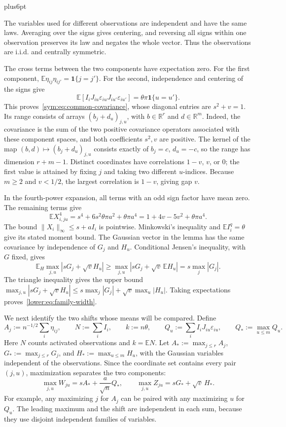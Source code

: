 \documentclass[11pt,letterpaper,twoside,leqno]{article}
\makeatletter
\theoremstyle{bookplain}
\theoremstyle{bookremark}
\renewenvironment{proof}[1][\proofname]{\par
  \pushQED{\qed}\normalfont\topsep6pt plus6pt\relax
  \trivlist\item[\hskip\labelsep\bfseries #1\@addpunct{.}]\ignorespaces
}{\popQED\endtrivlist\@endpefalse}
\newcommand{\E}{\mathbb E}
\newcommand{\R}{\mathbb R}
\newcommand{\ind}{\mathbf 1}
\makeatother
\begin{document}
\begin{proof}
The variables used for different observations are independent and
have the same laws. Averaging over the signs gives centering, and
reversing all signs within one observation preserves its law and
negates the whole vector. Thus the observations are i.i.d. and
centrally symmetric.

The cross terms between the two components have expectation zero.
For the first component,
$\E\eta_{ij}\eta_{ij'}=\ind\{j=j'\}$. For the second,
independence and centering of the signs give
\[
 \E[I_iJ_{iu}\varepsilon_{iu}J_{iu'}\varepsilon_{iu'}]
 =\theta\pi\ind\{u=u'\}.
\]
This proves~\eqref{sym:eq:common-covariance}, whose diagonal
entries are $s^2+v=1$. Its range consists of arrays
$(b_j+d_u)_{j,u}$, with $b\in\R^r$ and $d\in\R^m$.
Indeed, the covariance is the sum of the two positive covariance
operators associated with these component spaces, and both
coefficients $s^2,v$ are positive. The kernel of the map
$(b,d)\mapsto(b_j+d_u)_{j,u}$ consists exactly of
$b_j=c$, $d_u=-c$, so the range has dimension $r+m-1$.
Distinct coordinates have correlations $1-v$, $v$, or $0$;
the first value is attained by fixing $j$ and taking two different
$u$-indices. Because $m\ge2$ and $v<1/2$, the largest
correlation is $1-v$, giving gap $v$.

In the fourth-power expansion, all terms with an odd sign factor
have mean zero. The remaining terms give
\[
 \E X_{i,ju}^4=s^4+6s^2\theta\pi a^2+\theta\pi a^4
              =1+4v-5v^2+\theta\pi a^4.
\]
The bound $\|X_i\|_\infty\le s+aI_i$ is pointwise.
Minkowski's inequality and $\E I_i^q=\theta$ give its stated
moment bound. The Gaussian vector in the lemma has the same
covariance by independence of $G_j$ and $H_u$.
Conditional Jensen's inequality, with $G$ fixed, gives
\[
 \E_H\max_{j,u}|sG_j+\sqrt v H_u|
 \ge\max_{j,u}|sG_j+\sqrt v\,\E H_u|
 =s\max_j|G_j|.
\]
The triangle inequality gives the upper bound
$\max_{j,u}|sG_j+\sqrt v H_u|
\le s\max_j|G_j|+\sqrt v\max_u|H_u|$.
Taking expectations proves~\eqref{lower:eq:family-width}.
\end{proof}

We next identify the two shifts whose means will be compared.
Define
\[
 A_j:=n^{-1/2}\sum_i\eta_{ij},\qquad
 N:=\sum_iI_i,\qquad k:=n\theta,\qquad
 Q_u:=\sum_iI_iJ_{iu}\varepsilon_{iu},\qquad
 Q_*:=\max_{u\le m}Q_u.
\]
Here $N$ counts activated observations and $k=\E N$.
Let $A_*:=\max_{j\le r}A_j$, $G_*:=\max_{j\le r}G_j$,
and $H_*:=\max_{u\le m}H_u$, with the Gaussian variables
independent of the observations. Since the coordinate set contains
every pair $(j,u)$, maximization separates the two components:
\begin{equation}
 \max_{j,u}W_{ju}=sA_*+\frac a{\sqrt n}Q_*,\qquad
 \max_{j,u}Z_{ju}=sG_*+\sqrt v\,H_*.
 \label{sym:eq:common-maxima}
\end{equation}
For example, any maximizing $j$ for $A_j$ can be paired with
any maximizing $u$ for $Q_u$. The leading maximum and the shift
are independent in each sum, because they use disjoint independent
families of variables.
\end{document}
